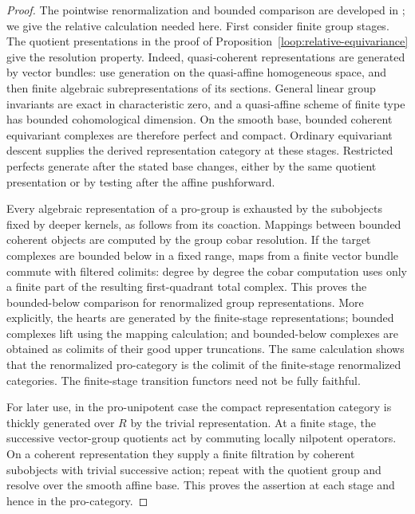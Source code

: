 \begin{proof}
The pointwise renormalization and bounded comparison are developed in
\cite[Sections~9.11--9.13 and~10.8]{RaskinHomological}; we give the
relative calculation needed here.  First consider finite group stages.
The quotient presentations in
the proof of Proposition~\ref{loop:relative-equivariance} give the
resolution property.  Indeed, quasi-coherent representations are
generated by vector bundles: use generation on the quasi-affine
homogeneous space, and then finite algebraic subrepresentations of
its sections.  General linear group invariants are exact in
characteristic zero, and a quasi-affine scheme of finite type has
bounded cohomological dimension.  On the smooth base, bounded coherent
equivariant complexes are therefore perfect and compact.  Ordinary
equivariant descent supplies the derived representation category at
these stages.  Restricted perfects generate after the stated base
changes, either by the same quotient presentation or by testing after
the affine pushforward.

Every algebraic representation of a pro-group is exhausted by the
subobjects fixed by deeper kernels, as follows from its coaction.
Mappings between bounded coherent objects are computed by the group
cobar resolution.  If the target complexes are bounded below in a
fixed range, maps from a finite vector bundle commute with filtered
colimits: degree by degree the cobar computation uses only a finite
part of the resulting first-quadrant total complex.  This proves the
bounded-below comparison for renormalized group representations.
More explicitly, the hearts are generated by the finite-stage
representations; bounded complexes lift using the mapping calculation;
and bounded-below complexes are obtained as colimits of their good
upper truncations.  The same calculation shows that the renormalized
pro-category is the colimit of the finite-stage renormalized
categories.  The finite-stage transition functors need not be fully
faithful.

For later use, in the pro-unipotent case the compact representation
category is thickly generated over $R$ by the trivial representation.
At a finite stage, the successive vector-group quotients act by
commuting locally nilpotent operators.  On a coherent representation
they supply a finite filtration by coherent subobjects with trivial
successive action; repeat with the quotient group and resolve over
the smooth affine base.  This proves the assertion at each stage and
hence in the pro-category.


\end{proof}
